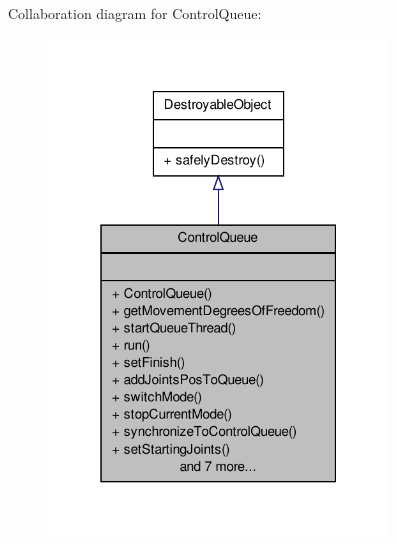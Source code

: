 \-Collaboration diagram for \-Control\-Queue\-:\nopagebreak
\begin{figure}[H]
\begin{center}
\leavevmode
\includegraphics[width=256pt]{classControlQueue__coll__graph}
\end{center}
\end{figure}
